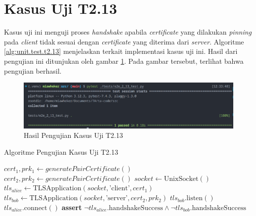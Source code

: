 \section{Kasus Uji T2.13}

Kasus uji ini menguji proses \emph{handshake} apabila \emph{certificate} yang dilakukan \emph{pinning} pada \emph{client} tidak sesuai dengan \emph{certificate} yang diterima dari \emph{server}. Algoritme \ref{alg:unit.test.t2.13} menjelaskan terkait implementasi kasus uji ini. Hasil dari pengujian ini ditunjukan oleh gambar \ref{fig:unit.test.t2.13}. Pada gambar tersebut, terlihat bahwa pengujian berhasil.

\begin{figure}[ht]
  \centering
  \includegraphics[width=\textwidth]{chapters/res/appendix-4/2.13.png}
  \caption{Hasil Pengujian Kasus Uji T2.13}
  \label{fig:unit.test.t2.13}
\end{figure}


\begin{algorithm}
  \caption{Algoritme Pengujian Kasus Uji T2.13}
  \label{alg:unit.test.t2.13}
  \begin{algorithmic}
    \State $cert_1, prk_1 \gets generatePairCertificate()$
    \State $cert_2, prk_2 \gets generatePairCertificate()$
    \State $socket \gets \text{UnixSocket}()$
    \State $tls_{alice} \gets \text{TLSApplication}(socket, \text{'client'}, cert_1)$ 
    \State $tls_{bob} \gets \text{TLSApplication}(socket, \text{'server'}, cert_2, prk_2)$
    \State
    \State $tls_{bob}.\text{listen}()$  
    \State $tls_{alice}.\text{connect}()$  
    \State
    \State
    \State \textbf{assert} $\lnot tls_{alice}.\text{handshakeSuccess} \land \lnot tls_{bob}.\text{handshakeSuccess}$
  \end{algorithmic}
\end{algorithm}
